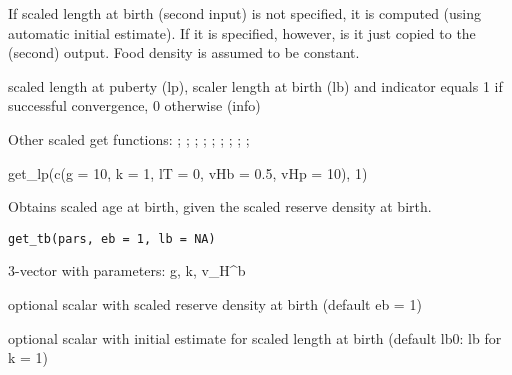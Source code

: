 \documentclass[a4paper]{book}
\begin{document}
%
\begin{Details}\relax
If scaled length at birth (second input) is not specified, it is computed (using automatic initial estimate).
If it is specified, however, is it just copied to the (second) output. Food density is assumed to be constant.
\end{Details}
%
\begin{Value}
scaled length at puberty (lp), scaler length at birth (lb)
and indicator equals 1 if successful convergence, 0 otherwise (info)
\end{Value}
%
\begin{SeeAlso}\relax
Other scaled get functions: ;
; ;
; ;
; ;
;
;
\end{SeeAlso}
%
\begin{Examples}
\begin{ExampleCode}
get_lp(c(g = 10, k = 1, lT = 0, vHb = 0.5, vHp = 10), 1)
\end{ExampleCode}
\end{Examples}
%
\begin{Description}\relax
Obtains scaled age at birth, given the scaled reserve density at birth.
\end{Description}
%
\begin{Usage}
\begin{verbatim}
get_tb(pars, eb = 1, lb = NA)
\end{verbatim}
\end{Usage}
%
\begin{Arguments}
\begin{ldescription}
\item[\code{pars}] 3-vector with parameters: g, k, v\_H\textasciicircum{}b

\item[\code{eb}] optional scalar with scaled reserve density at birth (default eb = 1)

\item[\code{lb0}] optional scalar with initial estimate for scaled length at birth (default lb0: lb for k = 1)
\end{ldescription}
\end{Arguments}
\end{document}
